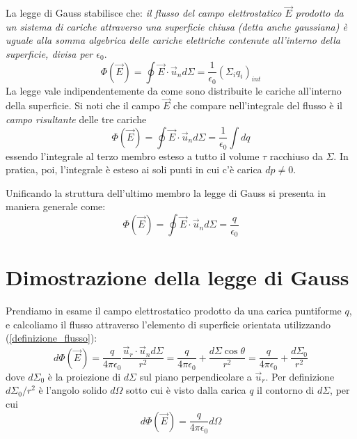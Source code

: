 \documentclass[class=book, crop=false, oneside, 12pt]{standalone}
\begin{document}
La legge di Gauss stabilisce che: 
\emph{il flusso del campo elettrostatico \(\overrightarrow{E}\) prodotto da un sistema di cariche attraverso una superficie chiusa (detta anche gaussiana) è uguale alla somma algebrica delle cariche elettriche contenute all'interno della superficie, divisa per \(\epsilon_0\)}.
\begin{equation}
    \Phi (\overrightarrow{E}) = \oint \overrightarrow{E} \cdot \overrightarrow{u}_n d \Sigma = \frac{1}{\epsilon_0} (\Sigma_i q_i)_{int}
\end{equation}
La legge vale indipendentemente da come sono distribuite le cariche all'interno della superficie.
Si noti che il campo \(\overrightarrow{E}\) che compare nell'integrale del flusso è il \emph{campo risultante} delle tre cariche
\begin{equation}
    \Phi (\overrightarrow{E}) = \oint \overrightarrow{E} \cdot \overrightarrow{u}_n d \Sigma = \frac{1}{\epsilon_0} \int dq
\end{equation}
essendo l'integrale al terzo membro esteso a tutto il volume \(\tau\) racchiuso da \(\Sigma\). 
In pratica, poi, l'integrale è esteso ai soli punti in cui c'è carica \(dp \neq 0\). 

Unificando la struttura dell'ultimo membro la legge di Gauss si presenta in maniera generale come:
\begin{equation}
    \Phi (\overrightarrow{E}) = \oint \overrightarrow{E} \cdot \overrightarrow{u}_n d \Sigma = \frac{q}{\epsilon_0}
\end{equation}

\section{Dimostrazione della legge di Gauss}

Prendiamo in esame il campo elettrostatico prodotto da una carica puntiforme \(q\), e calcoliamo il flusso attraverso l'elemento di superficie orientata utilizzando (\ref{definizione_flusso}):
\begin{equation*}
    d \Phi (\overrightarrow{E}) = \frac{q}{4 \pi \epsilon_0} \frac{\overrightarrow{u}_r \cdot \overrightarrow{u}_n d \Sigma}{r^2} = \frac{q}{4 \pi \epsilon_0} + \frac{d \Sigma \cos \theta}{r^2} = \frac{q}{4 \pi \epsilon_0} + \frac{d \Sigma_0 }{r^2}
\end{equation*}
dove \(d \Sigma_0\) è la proiezione di \(d \Sigma\) sul piano perpendicolare a \(\overrightarrow{u}_r\). 
Per definizione \(d \Sigma_0 / r^2\) è l'angolo solido \(d \Omega\) sotto cui è visto dalla carica \(q\) il contorno di \(d \Sigma\), per cui
\begin{equation}
    d \Phi (\overrightarrow{E}) = \frac{q}{4 \pi \epsilon_0} d \Omega
\end{equation}
\end{document}
